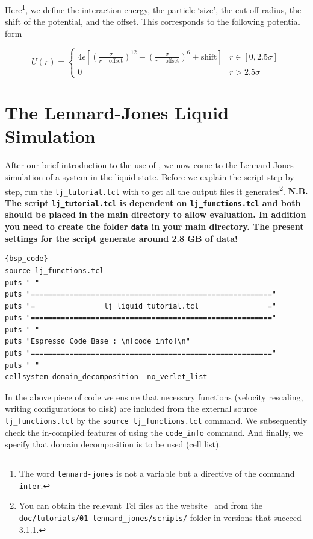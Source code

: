 \documentclass[
paper=a4,                       %
fontsize=11pt,                  %
twoside,                        %
footsepline,                    %
headsepline,                    %
headinclude=false,              %
footinclude=false,              %
pagesize,                       %
]{scrartcl}
\begin{document}
\noindent Here\footnote{The word \texttt{lennard-jones} is not a variable but a directive of the command \texttt{inter}.}, we define the interaction energy, the particle `size', the cut-off radius, the shift of the potential, and the offset. This corresponds to the following potential form 

\begin{equation}
\nonumber U(r) = \left\{ \begin{array}{cc} 4 \epsilon\left[ \left(\frac{\sigma}{r-\text{offset}} \right)^{12} - \left(\frac{\sigma}{r-\text{offset}} \right)^{6} + \text{shift}\right] & r \in [0,2.5\sigma] \\ 0 & r > 2.5 \sigma \end{array} \right.
\end{equation}

\section{The Lennard-Jones Liquid Simulation }
  
After our brief introduction to the use of \es{}, we now come to the Lennard-Jones simulation of a system in the liquid state. Before we explain the script step by step, run the \texttt{lj\_tutorial.tcl} with \es{} to get all the output files it generates\footnote{You can obtain the relevant Tcl files at the \es{} website~\cite{esp_url} and from the \texttt{doc/tutorials/01-lennard\_jones/scripts/} folder in versions that succeed 3.1.1.}. \textbf{N.B. The script \texttt{lj\_tutorial.tcl} is dependent on \texttt{lj\_functions.tcl} and both should be placed in the \es{} main directory to allow evaluation. In addition you need to create the folder \texttt{data} in your \es{} main directory. The present settings for the \es{} script generate around 2.8 GB of data!}

{\small\vspace{0,2cm}
\begin{lstlisting}{bsp_code}
source lj_functions.tcl
puts " "
puts "========================================================"
puts "=                lj_liquid_tutorial.tcl                ="
puts "========================================================"
puts " "
puts "Espresso Code Base : \n[code_info]\n"
puts "========================================================"
puts " "
cellsystem domain_decomposition -no_verlet_list
\end{lstlisting}}\vspace{0,2cm}

\noindent In the above piece of code we ensure that necessary functions (velocity rescaling, writing configurations to disk) are included from the external source \texttt{lj\_functions.tcl} by the \lstinline|source lj_functions.tcl| command. We subsequently check the in-compiled features of \es{} using the \lstinline|code_info| command. And finally, we specify that domain decomposition is to be used (cell list).
\end{document}
